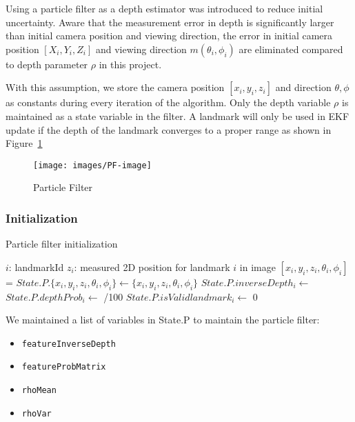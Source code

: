 \documentclass[conference]{IEEEtran}
\begin{document}
Using a particle filter as a depth estimator was introduced to reduce initial uncertainty. Aware that the measurement error in depth is significantly larger than initial camera position and viewing direction, the error in initial camera position $[X_i, Y_i, Z_i]$ and viewing direction $m(\theta_i, \phi_i)$ are eliminated compared to depth parameter $\rho$ in this project.

With this assumption, we store the camera position $[x_i, y_i, z_i]$ and direction $\theta, \phi$ as constants during every iteration of the algorithm. Only the depth variable $\rho$ is maintained as a state variable in the filter. A landmark will only be used in EKF update if the depth of the landmark converges to a proper range as shown in Figure~\ref{fig:pfImg}

\begin{figure}[h]
\centering
\texttt{[image: images/PF-image]}
\caption{Particle Filter }
\label{fig:pfImg}
\end{figure}


\subsubsection{Initialization}

\begin{algorithm}[H]
\caption{Particle filter initialization}
\label{alg:PFinit}
    \begin{algorithmic}
    	\Statex {} {$i$: landmarkId}
        \Statex {} {$z_i$: measured 2D position for landmark $i$ in image}
        \State $[x_i,y_i,z_i,\theta_i,\phi_i]$=
        \State $State.P.\{x_i,y_i,z_i,\theta_i,\phi_i\} \gets \{x_i,y_i,z_i,\theta_i,\phi_i\}$
        \State $State.P.inverseDepth_i \gets$ 
        \State $State.P.depthProb_i \gets$ /100
        \State $State.P.isValidlandmark_i \gets$ 0
    \EndFunction
    \end{algorithmic}
\end{algorithm}


We maintained a list of variables in State.P to maintain the particle filter:
\begin{itemize}
\item \texttt{featureInverseDepth}
\item \texttt{featureProbMatrix}
\item \texttt{rhoMean}
\item \texttt{rhoVar}
\end{itemize}
\end{document}
